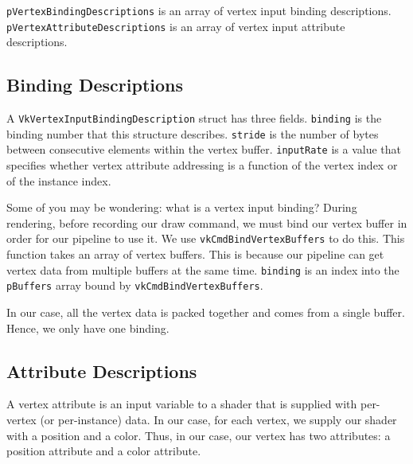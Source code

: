 \texttt{pVertexBindingDescriptions} is an array of vertex input binding descriptions.
\texttt{pVertexAttributeDescriptions} is an array of vertex input attribute descriptions.

\begin{minipage}{\linewidth}{\noindent}
    
\end{minipage}

\subsection{Binding Descriptions}

A \texttt{VkVertexInputBindingDescription} struct has three fields.
\texttt{binding} is the binding number that this structure describes.
\texttt{stride} is the number of bytes between consecutive elements within the
vertex buffer.
\texttt{inputRate} is a value that specifies whether vertex attribute addressing
is a function of the vertex index or of the instance index.

Some of you may be wondering: what is a vertex input binding?
During rendering, before recording our draw command, we must bind our vertex buffer
in order for our pipeline to use it.
We use \texttt{vkCmdBindVertexBuffers} to do this.
This function takes an array of vertex buffers.
This is because our pipeline can get vertex data from multiple buffers
at the same time.
\texttt{binding} is an index into the \texttt{pBuffers} array bound by
\texttt{vkCmdBindVertexBuffers}.

In our case, all the vertex data is packed together and comes from a single buffer.
Hence, we only have one binding.

\begin{minipage}{\linewidth}{\noindent}
    
\end{minipage}

\subsection{Attribute Descriptions}

A vertex attribute is an input variable to a shader that is supplied with
per-vertex (or per-instance) data.
In our case, for each vertex, we supply our shader with a position and a color.
Thus, in our case, our vertex has two attributes: a position attribute and a
color attribute.

